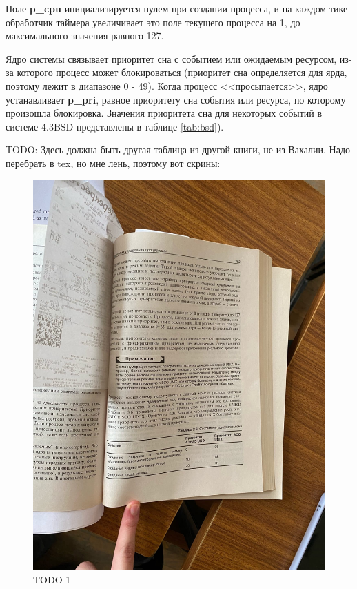 Поле \textbf{p\_cpu} инициализируется нулем при создании процесса, и на каждом тике обработчик таймера увеличивает это поле текущего процесса на 1, до максимального значения равного 127.

Ядро системы связывает приоритет сна с событием или ожидаемым ресурсом, из-за которого процесс может блокироваться (приоритет сна определяется для ярда, поэтому лежит в диапазоне 0 - 49). Когда процесс <<просыпается>>, ядро устанавливает \textbf{p\_pri}, равное приоритету сна события или ресурса, по которому произошла блокировка.
Значения приоритета сна для некоторых событий в системе 4.3BSD представлены в таблице \ref{tab:bsd}).

TODO: Здесь должна быть другая таблица из другой книги, не из Вахалии. Надо перебрать в tex, но мне лень, поэтому вот скрины: 

\begin{figure}[h]
	\centering
	\captionsetup{justification=centering}
	\includegraphics[width=150mm]{img/todo1.jpeg}
	\caption{TODO 1}
	\label{fig:todo1}
\end{figure}

